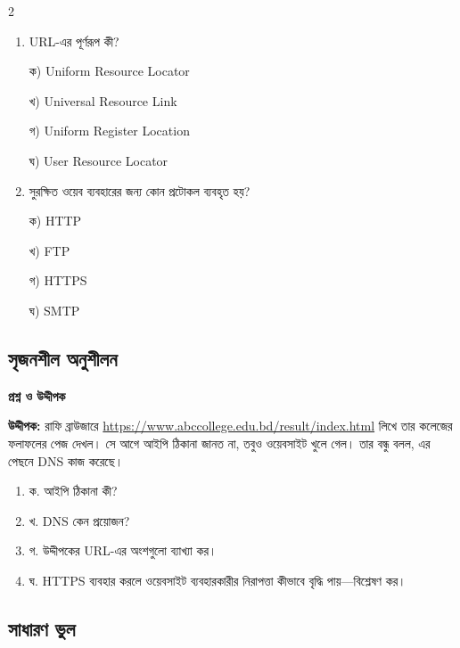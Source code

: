 \begin{multicols}{2}
\begin{enumerate}[leftmargin=*,itemsep=4pt]
\item \begin{minipage}[t]{\linewidth}\vspace{0pt}
URL-এর পূর্ণরূপ কী?
\par ক) Uniform Resource Locator
\par খ) Universal Resource Link
\par গ) Uniform Register Location
\par ঘ) User Resource Locator\\
\end{minipage}

\item \begin{minipage}[t]{\linewidth}\vspace{0pt}
সুরক্ষিত ওয়েব ব্যবহারের জন্য কোন প্রটোকল ব্যবহৃত হয়?
\par ক) HTTP
\par খ) FTP
\par গ) HTTPS
\par ঘ) SMTP\\
\end{minipage}
\end{enumerate}
\end{multicols}

\subsection{সৃজনশীল অনুশীলন}

\noindent
\textbf{\color{chFourRose}প্রশ্ন ও উদ্দীপক}\par
\textbf{উদ্দীপক:} রাফি ব্রাউজারে \url{https://www.abccollege.edu.bd/result/index.html} লিখে তার কলেজের ফলাফলের পেজ দেখল। সে আগে আইপি ঠিকানা জানত না, তবুও ওয়েবসাইট খুলে গেল। তার বন্ধু বলল, এর পেছনে DNS কাজ করেছে।

\begin{enumerate}
\item ক. আইপি ঠিকানা কী?
\item খ. DNS কেন প্রয়োজন?
\item গ. উদ্দীপকের URL-এর অংশগুলো ব্যাখ্যা কর।
\item ঘ. HTTPS ব্যবহার করলে ওয়েবসাইট ব্যবহারকারীর নিরাপত্তা কীভাবে বৃদ্ধি পায়—বিশ্লেষণ কর।
\end{enumerate}
\par\smallskip
\subsection{সাধারণ ভুল}

